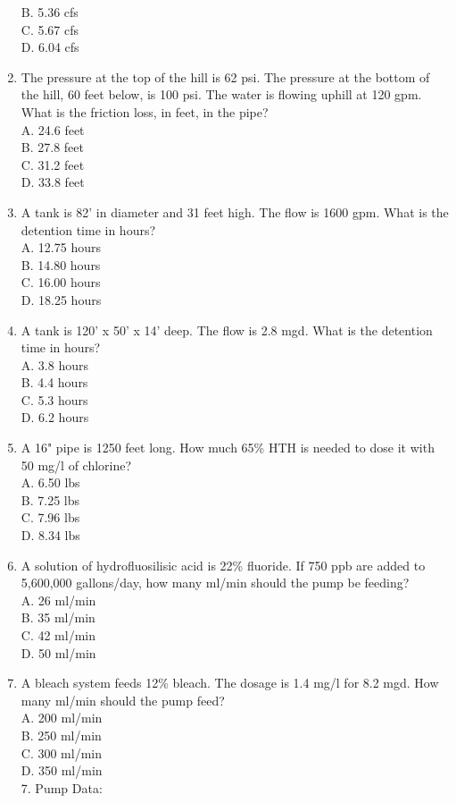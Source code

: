 \begin{enumerate}
B. 5.36 cfs\\
C. 5.67 cfs\\
D. 6.04 cfs\\
\item The pressure at the top of the hill is 62 psi. The pressure at the bottom of the hill, 60 feet below, is 100 psi. The water is flowing uphill at 120 gpm. What is the friction loss, in feet, in the pipe?\\
A. 24.6 feet\\
B. 27.8 feet\\
C. 31.2 feet\\
D. 33.8 feet\\
\item  A tank is 82' in diameter and 31 feet high. The flow is 1600 gpm. What is the detention time in hours?\\
A. 12.75 hours\\
B. 14.80 hours\\
C. 16.00 hours\\
D. 18.25 hours\\

\item A tank is 120' x 50' x 14' deep. The flow is 2.8 mgd.  What is the detention time in hours?\\
A. 3.8 hours\\
B. 4.4 hours\\
C. 5.3 hours\\
D. 6.2 hours\\

\item A 16" pipe is 1250 feet long. How much 65\% HTH is needed to dose it with 50 mg/l of chlorine?\\
A. 6.50 lbs\\
B. 7.25 lbs\\
C. 7.96 lbs\\
D. 8.34 lbs\\

\item A solution of hydrofluosilisic acid is 22\% fluoride. If 750 ppb are added to 5,600,000 gallons/day, how many ml/min should the pump be feeding?\\
A. 26 ml/min\\
B. 35 ml/min\\
C. 42 ml/min\\
D. 50 ml/min\\

\item A bleach system feeds 12\% bleach. The dosage is 1.4 mg/l for 8.2 mgd. How many ml/min should the pump feed?\\
A. 200 ml/min\\
B. 250 ml/min\\
C. 300 ml/min\\
D. 350 ml/min\\
7. Pump Data:\\


\end{enumerate}
